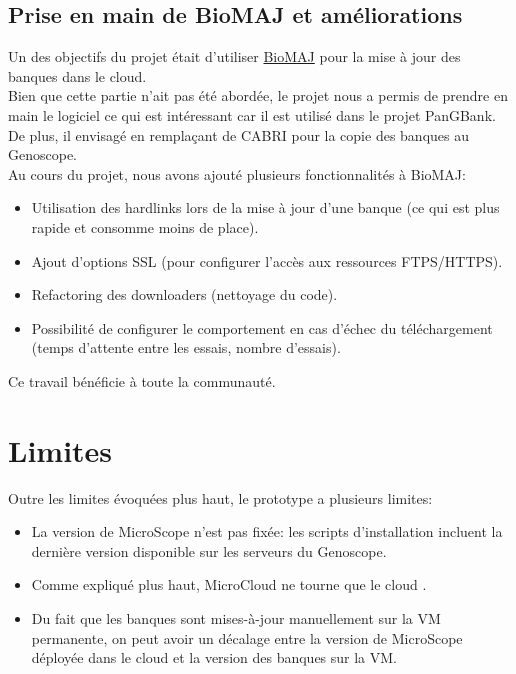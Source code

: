 \subsection{Prise en main de BioMAJ et améliorations}\label{subsec:biomaj}

Un des objectifs du projet était d'utiliser \href{https://biomaj.genouest.org/}{BioMAJ}
pour la mise à jour des banques dans le cloud.\\

Bien que cette partie n'ait pas été abordée, le projet nous a permis de prendre en main le logiciel
ce qui est intéressant car il est utilisé dans le projet PanGBank.
De plus, il envisagé en remplaçant de CABRI pour la copie des banques au Genoscope.\\

Au cours du projet, nous avons ajouté plusieurs fonctionnalités à BioMAJ:
\begin{itemize}
    \item Utilisation des hardlinks lors de la mise à jour d'une banque (ce qui est plus rapide et consomme moins de place).
    \item Ajout d'options SSL (pour configurer l'accès aux ressources FTPS/HTTPS).
    \item Refactoring des downloaders (nettoyage du code).
    \item Possibilité de configurer le comportement en cas d'échec du téléchargement (temps d'attente entre les essais, nombre d'essais).
\end{itemize}

Ce travail bénéficie à toute la communauté.

\section{Limites}

Outre les limites évoquées plus haut, le prototype a plusieurs limites:
\begin{itemize}
    \item La version de MicroScope n'est pas fixée: les scripts d'installation incluent la dernière version disponible sur les serveurs du Genoscope.
    \item Comme expliqué plus haut, MicroCloud ne tourne que le cloud .
    \item Du fait que les banques sont mises-à-jour manuellement sur la VM permanente, on peut avoir un décalage entre la version de MicroScope déployée dans le cloud
          et la version des banques sur la VM.
\end{itemize}

